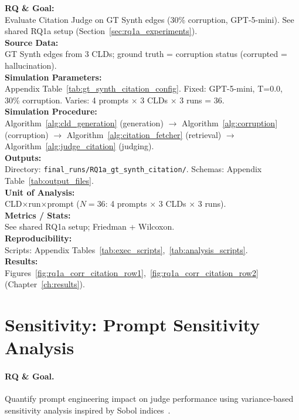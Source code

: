 \textbf{RQ \& Goal:}\\
Evaluate Citation Judge on GT Synth edges (30\% corruption, GPT-5-mini). See shared RQ1a setup (Section~\ref{sec:rq1a_experiments}).\\
\textbf{Source Data:}\\
GT Synth edges from 3 CLDs; ground truth = corruption status (corrupted = hallucination).\\
\textbf{Simulation Parameters:}\\
Appendix Table~\ref{tab:gt_synth_citation_config}. Fixed: GPT-5-mini, T=0.0, 30\% corruption. Varies: 4 prompts $\times$ 3 CLDs $\times$ 3 runs = 36.\\
\textbf{Simulation Procedure:}\\
Algorithm~\ref{alg:cld_generation} (generation) $\rightarrow$ Algorithm~\ref{alg:corruption} (corruption) $\rightarrow$ Algorithm~\ref{alg:citation_fetcher} (retrieval) $\rightarrow$ Algorithm~\ref{alg:judge_citation} (judging).\\
\textbf{Outputs:}\\
Directory: \texttt{final\_runs/RQ1a\_gt\_synth\_citation/}. Schemas: Appendix Table~\ref{tab:output_files}.\\
\textbf{Unit of Analysis:}\\
CLD$\times$run$\times$prompt ($N=36$: 4 prompts $\times$ 3 CLDs $\times$ 3 runs).\\
\textbf{Metrics / Stats:}\\
See shared RQ1a setup; Friedman + Wilcoxon.\\
\textbf{Reproducibility:}\\
Scripts: Appendix Tables~\ref{tab:exec_scripts},~\ref{tab:analysis_scripts}.\\
\textbf{Results:}\\
Figures~\ref{fig:rq1a_corr_citation_row1},~\ref{fig:rq1a_corr_citation_row2} (Chapter~\ref{ch:results}).

\section{Sensitivity: Prompt Sensitivity Analysis}
\label{sec:rq1a_sensitivity}

\paragraph{RQ \& Goal.}
Quantify prompt engineering impact on judge performance using variance-based sensitivity analysis inspired by Sobol indices~\cite{sobol1993sensitivity}.

